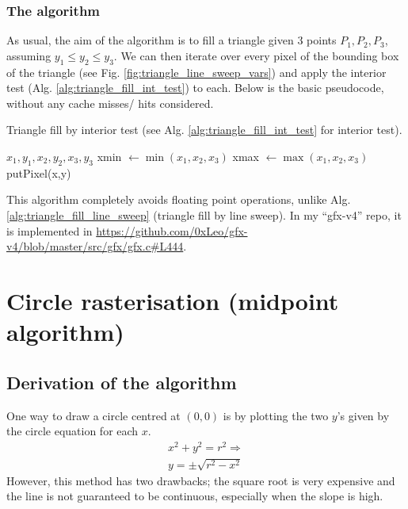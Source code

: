 \documentclass[a4paper]{article}
\begin{document}
\subsubsection{The algorithm}

As usual, the aim of the algorithm is to fill a triangle given 3 points $P_1, P_2, P_3$, assuming $y_1\leq y_2 \leq y_3$. We can then iterate over every pixel of the bounding box of the triangle (see Fig. \ref{fig:triangle_line_sweep_vars}) and apply the interior test (Alg. \ref{alg:triangle_fill_int_test}) to each. Below is the basic pseudocode, without any cache misses/ hits considered.

\begin{algorithm}[H]
\caption{Triangle fill by interior test (see Alg. \ref{alg:triangle_fill_int_test} for interior test).}
\begin{algorithmic}[1]
 {$x_1,y_1,x_2,y_2,x_3,y_3$} 
\State xmin $\leftarrow \min(x_1,x_2,x_3)$
\State xmax $\leftarrow \max(x_1,x_2,x_3)$
 putPixel(x,y)
\EndIf
\EndFor
\EndFor
\EndProcedure
\end{algorithmic}
\end{algorithm}
This algorithm completely avoids floating point operations, unlike Alg. \ref{alg:triangle_fill_line_sweep} (triangle fill by line sweep). In my ``gfx-v4'' repo, it is implemented in \url{https://github.com/0xLeo/gfx-v4/blob/master/src/gfx/gfx.c#L444}.




\clearpage
\section{Circle rasterisation (midpoint algorithm)}

\subsection{Derivation of the algorithm}
One way to draw a circle centred at $(0,0)$ is by plotting the two $y$'s given by the circle equation for each $x$.  
\begin{align*}
x^2+y^2=r^2 \Rightarrow \\
y = \pm \sqrt{r^2 - x^2}
\end{align*}
However, this method has two drawbacks; the square root is very expensive and the line is not guaranteed to be continuous, especially when the slope is high.
\end{document}
